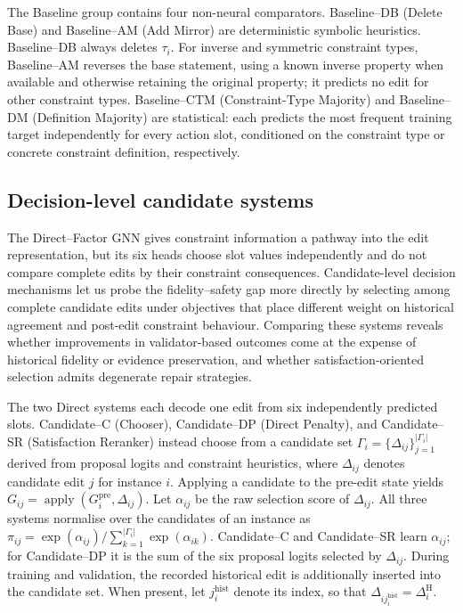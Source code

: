 \documentclass[a4paper,UKenglish,cleveref,autoref,thm-restate]{tgdk-v2021}
\newcommand{\Gpre}{G_i^{\mathrm{pre}}}
\newcommand{\histedit}{\Delta^{\mathrm{H}}}
\begin{document}
The Baseline group contains four non-neural comparators. Baseline--DB (Delete Base) and Baseline--AM (Add Mirror) are deterministic symbolic heuristics. Baseline--DB always deletes \(\tau_i\). For inverse and symmetric constraint types, Baseline--AM reverses the base statement, using a known inverse property when available and otherwise retaining the original property; it predicts no edit for other constraint types. Baseline--CTM (Constraint-Type Majority) and Baseline--DM (Definition Majority) are statistical: each predicts the most frequent training target independently for every action slot, conditioned on the constraint type or concrete constraint definition, respectively.

\subsection{Decision-level candidate systems}
\label{subsec:decision-variants}

The Direct--Factor GNN gives constraint information a pathway into the edit representation, but its six heads choose slot values independently and do not compare complete edits by their constraint consequences. Candidate-level decision mechanisms let us probe the fidelity--safety gap more directly by selecting among complete candidate edits under objectives that place different weight on historical agreement and post-edit constraint behaviour. Comparing these systems reveals whether improvements in validator-based outcomes come at the expense of historical fidelity or evidence preservation, and whether satisfaction-oriented selection admits degenerate repair strategies.

The two Direct systems each decode one edit from six independently predicted slots. Candidate--C (Chooser), Candidate--DP (Direct Penalty), and Candidate--SR (Satisfaction Reranker) instead choose from a candidate set \(\Gamma_i=\{\Delta_{ij}\}_{j=1}^{|\Gamma_i|}\) derived from proposal logits and constraint heuristics, where \(\Delta_{ij}\) denotes candidate edit \(j\) for instance \(i\). Applying a candidate to the pre-edit state yields \(G_{ij}=\operatorname{apply}(\Gpre,\Delta_{ij})\). Let \(\alpha_{ij}\) be the raw selection score of \(\Delta_{ij}\). All three systems normalise over the candidates of an instance as \(\pi_{ij}=\exp(\alpha_{ij})/\sum_{k=1}^{|\Gamma_i|}\exp(\alpha_{ik})\). Candidate--C and Candidate--SR learn \(\alpha_{ij}\); for Candidate--DP it is the sum of the six proposal logits selected by \(\Delta_{ij}\). During training and validation, the recorded historical edit is additionally inserted into the candidate set. When present, let \(j_i^{\mathrm{hist}}\) denote its index, so that \(\Delta_{i j_i^{\mathrm{hist}}}=\histedit_i\).
\end{document}
